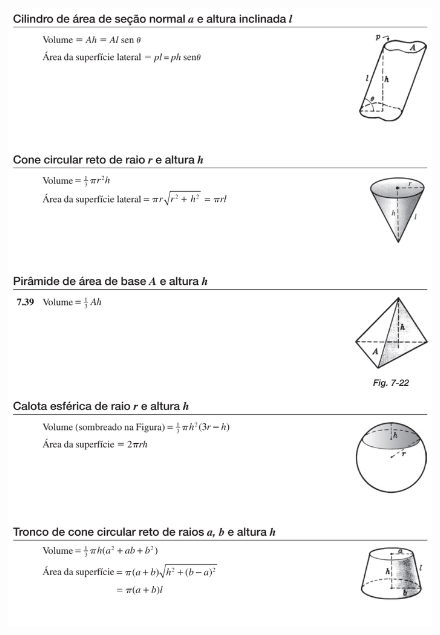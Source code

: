\begin{figure}[H]
    \centering
    \includegraphics[width=\textwidth]{matematica/geometria/formulas5}
\end{figure}


